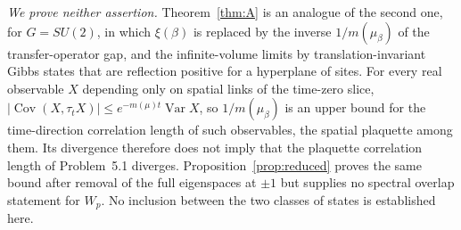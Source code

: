 \documentclass[11pt,a4paper]{article}
\theoremstyle{plain}
\theoremstyle{definition}
\theoremstyle{remark}
\numberwithin{equation}{section}
\newcommand{\Var}{\operatorname{Var}}
\newcommand{\Cov}{\operatorname{Cov}}
\begin{document}
\emph{We prove neither assertion.} Theorem~\ref{thm:A} is an analogue of the second one, for $G=SU(2)$, in which $\xi(\beta)$ is replaced
by the inverse $1/m(\mu_\beta)$ of the transfer-operator gap, and the infinite-volume limits by translation-invariant Gibbs states that
are reflection positive for a hyperplane of sites. For every real observable $X$ depending only on spatial links of the time-zero slice,
$|\Cov(X,\tau_tX)|\le e^{-m(\mu)t}\Var X$, so $1/m(\mu_\beta)$ is an upper bound for the time-direction correlation length of such
observables, the spatial plaquette among them. Its divergence therefore does not imply that the plaquette correlation length of
Problem~5.1 diverges. Proposition~\ref{prop:reduced} proves the same bound after removal of the full eigenspaces at $\pm1$ but supplies
no spectral overlap statement for $W_p$. No inclusion between the two classes of states is established here.
\end{document}
